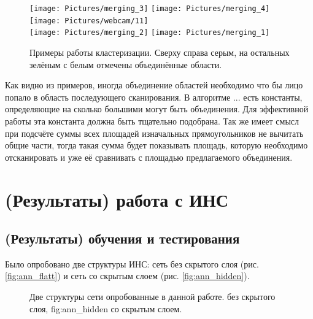 \documentclass[12pt]{report}
\begin{document}
\begin{figure}[h]
	\centering	
	\texttt{[image: Pictures/merging\_3]}\hspace{0.2cm}
	\texttt{[image: Pictures/merging\_4]}\hspace{0.2cm}
	\texttt{[image: Pictures/webcam/11]}\hspace{0.2cm}
	\\[0.5cm]
	\texttt{[image: Pictures/merging\_2]}\hspace{0.2cm}
	\texttt{[image: Pictures/merging\_1]}\hspace{0.2cm}
	
	\caption{Примеры работы кластеризации. Сверху справа серым, на остальных зелёным с белым отмечены объединённые 
области.}
	\label{fig:merging_examples}
\end{figure}

Как видно из примеров, иногда объединение областей необходимо что бы лицо попало в область последующего сканирования.   
В алгоритме ... есть константы, определяющие на сколько большими могут быть объединения. Для эффективной работы эта 
константа должна быть тщательно подобрана. Так же имеет смысл при подсчёте суммы всех площадей изначальных 
прямоугольников не вычитать общие части, тогда такая сумма будет показывать площадь, которую необходимо отсканировать  
и уже её сравнивать с площадью предлагаемого объединения.

\section{(Результаты) работа с ИНС}

\subsection{(Результаты) обучения и тестирования}

Было опробовано две структуры ИНС: сеть без скрытого слоя (рис. \ref{fig:ann_flatt}) и сеть со скрытым слоем (рис. 
\ref{fig:ann_hidden}).

\begin{figure}[h]
	\centering
	\caption{Две структуры сети опробованные в данной работе.  без скрытого слоя, \subref
{fig:ann_hidden} со скрытым слоем.}
	\label{fig:ann_structure}
\end{figure}
\end{document}
